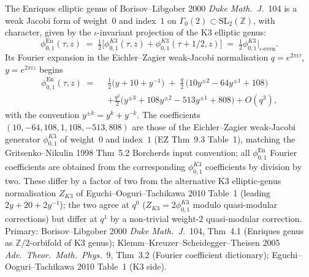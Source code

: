 \begin{proposition}
\label{prop:bkm-enriques-elliptic-genus}
The Enriques elliptic genus of Borisov--Libgober
2000 \emph{Duke Math.~J.}~104 is a weak Jacobi form
of weight~$0$ and index~$1$ on
$\Gamma_0(2)\subset\mathrm{SL}_2(\mathbb{Z})$, with character,
given by the $\iota$-invariant projection of the K3 elliptic genus:
\[
 \phi^{\mathrm{En}}_{0,1}(\tau, z)
 \;=\;
 \tfrac{1}{2}
 \bigl[\phi^{K3}_{0,1}(\tau,z) + \phi^{K3}_{0,1}(\tau+1/2,z)\bigr]
 \;=\;
 \tfrac{1}{2}\phi^{K3}_{0,1}\bigr|_{\iota\text{-even}}.
\]
Its Fourier expansion in the Eichler--Zagier weak-Jacobi
normalisation $q = e^{2\pi i\tau}$, $y = e^{2\pi iz}$ begins
\begin{align*}
 \phi^{\mathrm{En}}_{0,1}(\tau,z)
 \;=\;\;& \tfrac{1}{2}\bigl(y + 10 + y^{-1}\bigr)
 \;+\; \tfrac{q}{2}\,\bigl(10y^{\pm 2} - 64 y^{\pm 1} + 108\bigr)
 \\
 &+ \tfrac{q^2}{2}\bigl(y^{\pm 3} + 108 y^{\pm 2} - 513 y^{\pm 1} + 808\bigr)
 + O(q^3),
\end{align*}
with the convention $y^{\pm k} = y^k + y^{-k}$. The coefficients
$(10, -64, 108, 1, 108, -513, 808)$ are those of the
Eichler--Zagier weak-Jacobi generator $\phi_{0,1}^{K3}$ of
weight~$0$ and index~$1$ (EZ Thm~9.3 Table~1), matching the
Gritsenko--Nikulin 1998 Thm~5.2 Borcherds input convention; all
$\phi_{0,1}^{\mathrm{En}}$ Fourier coefficients are obtained from
the corresponding $\phi_{0,1}^{K3}$ coefficients by division by
two. These differ by a factor of two from the alternative K3
elliptic-genus normalisation $Z_{K3}$ of Eguchi--Ooguri--Tachikawa
2010 Table~1 (leading $2y + 20 + 2y^{-1}$); the two agree at
$q^0$ ($Z_{K3} = 2\phi_{0,1}^{K3}$ modulo quasi-modular corrections)
but differ at $q^1$ by a non-trivial weight-$2$ quasi-modular
correction.
Primary:
Borisov--Libgober 2000 \emph{Duke Math.~J.}~104, Thm~4.1
(Enriques genus as $\mathbb{Z}/2$-orbifold of K3 genus);
Klemm--Kreuzer--Scheidegger--Theisen 2005 \emph{Adv.~Theor.~Math.~Phys.}~9,
Thm~3.2 (Fourier coefficient dictionary);
Eguchi--Ooguri--Tachikawa 2010 Table~1 (K3 side).
\end{proposition}

